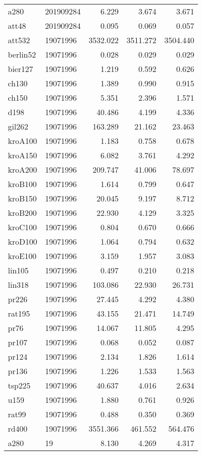 \begin{center}
\begin{longtable}{llrrr}
a280 & 201909284 & 6.229 & 3.674 & 3.671\\
att48 & 201909284 & 0.095 & 0.069 & 0.057\\
att532 &19071996 & 3532.022 & 3511.272 & 3504.440\\
berlin52 &19071996 & 0.028 & 0.029 & 0.029\\
bier127 &19071996 & 1.219 & 0.592 & 0.626\\
ch130 &19071996 & 1.389 & 0.990 & 0.915\\
ch150 &19071996 & 5.351 & 2.396 & 1.571\\
d198 &19071996 & 40.486 & 4.199 & 4.336\\
gil262 &19071996 & 163.289 & 21.162 & 23.463\\
kroA100 &19071996 & 1.183 & 0.758 & 0.678\\
kroA150 &19071996 & 6.082 & 3.761 & 4.292\\
kroA200 &19071996 & 209.747 & 41.006 & 78.697\\
kroB100 &19071996 & 1.614 & 0.799 & 0.647\\
kroB150 &19071996 & 20.045 & 9.197 & 8.712\\
kroB200 &19071996 & 22.930 & 4.129 & 3.325\\
kroC100 &19071996 & 0.804 & 0.670 & 0.666\\
kroD100 &19071996 & 1.064 & 0.794 & 0.632\\
kroE100 &19071996 & 3.159 & 1.957 & 3.083\\
lin105 &19071996 & 0.497 & 0.210 & 0.218\\
lin318 &19071996 & 103.086 & 22.930 & 26.731\\
pr226 &19071996 & 27.445 & 4.292 & 4.380\\
rat195 &19071996 & 43.155 & 21.471 & 14.749\\
pr76 &19071996 & 14.067 & 11.805 & 4.295\\
pr107 &19071996 & 0.068 & 0.052 & 0.087\\
pr124 &19071996 & 2.134 & 1.826 & 1.614\\
pr136 &19071996 & 1.226 & 1.533 & 1.563\\
tsp225 &19071996 & 40.637 & 4.016 & 2.634\\
u159  &19071996 & 1.880 & 0.761 & 0.926\\
rat99 &19071996 & 0.488 & 0.350 & 0.369\\
rd400 &19071996 & 3551.366 & 461.552 & 564.476\\
a280 & 19 & 8.130 & 4.269 & 4.317\\

\end{longtable}
\end{center}
